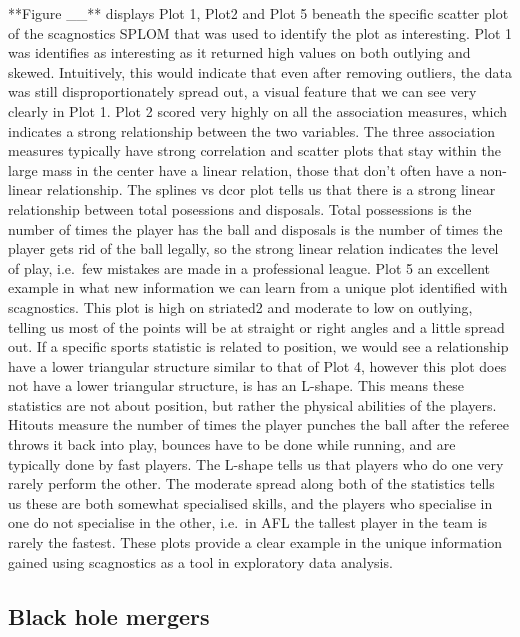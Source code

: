 **Figure \_\_** displays Plot 1, Plot2 and Plot 5 beneath the specific
scatter plot of the scagnostics SPLOM that was used to identify the plot
as interesting. Plot 1 was identifies as interesting as it returned high
values on both outlying and skewed. Intuitively, this would indicate
that even after removing outliers, the data was still disproportionately
spread out, a visual feature that we can see very clearly in Plot 1.
Plot 2 scored very highly on all the association measures, which
indicates a strong relationship between the two variables. The three
association measures typically have strong correlation and scatter plots
that stay within the large mass in the center have a linear relation,
those that don't often have a non-linear relationship. The splines vs
dcor plot tells us that there is a strong linear relationship between
total posessions and disposals. Total possessions is the number of times
the player has the ball and disposals is the number of times the player
gets rid of the ball legally, so the strong linear relation indicates
the level of play, i.e.~few mistakes are made in a professional league.
Plot 5 an excellent example in what new information we can learn from a
unique plot identified with scagnostics. This plot is high on striated2
and moderate to low on outlying, telling us most of the points will be
at straight or right angles and a little spread out. If a specific
sports statistic is related to position, we would see a relationship
have a lower triangular structure similar to that of Plot 4, however
this plot does not have a lower triangular structure, is has an L-shape.
This means these statistics are not about position, but rather the
physical abilities of the players. Hitouts measure the number of times
the player punches the ball after the referee throws it back into play,
bounces have to be done while running, and are typically done by fast
players. The L-shape tells us that players who do one very rarely
perform the other. The moderate spread along both of the statistics
tells us these are both somewhat specialised skills, and the players who
specialise in one do not specialise in the other, i.e.~in AFL the
tallest player in the team is rarely the fastest. These plots provide a
clear example in the unique information gained using scagnostics as a
tool in exploratory data analysis.

\hypertarget{black-hole-mergers}{%
\subsection{Black hole mergers}\label{black-hole-mergers}}

